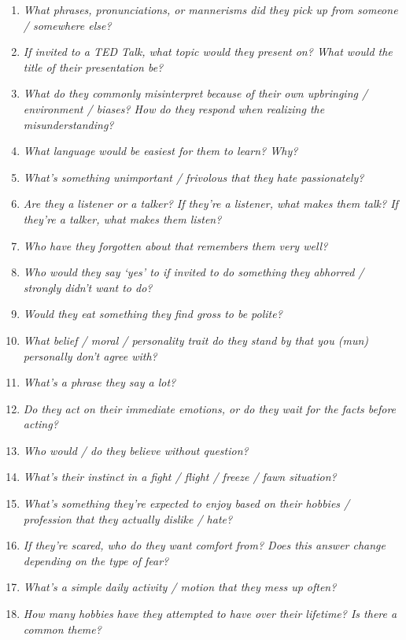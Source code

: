 \begin{enumerate}
    \item\textit{What phrases, pronunciations, or mannerisms did they pick up from someone / somewhere else?}
    \item\textit{If invited to a TED Talk, what topic would they present on? What would the title of their presentation be?}
    \item\textit{What do they commonly misinterpret because of their own upbringing / environment / biases? How do they respond when realizing the misunderstanding?}
    \item\textit{What language would be easiest for them to learn? Why?}
    \item\textit{What’s something unimportant / frivolous that they hate passionately?}
    \item\textit{Are they a listener or a talker? If they’re a listener, what makes them talk? If they’re a talker, what makes them listen?}
    \item\textit{Who have they forgotten about that remembers them very well?}
    \item\textit{Who would they say ‘yes’ to if invited to do something they abhorred / strongly didn’t want to do?}
    \item\textit{Would they eat something they find gross to be polite?}
    \item\textit{What belief / moral / personality trait do they stand by that you (mun) personally don’t agree with?}
    \item\textit{What’s a phrase they say a lot?}
    \item\textit{Do they act on their immediate emotions, or do they wait for the facts before acting?}
    \item\textit{Who would / do they believe without question?}
    \item\textit{What’s their instinct in a fight / flight / freeze / fawn situation?}
    \item\textit{What’s something they’re expected to enjoy based on their hobbies / profession that they actually dislike / hate?}
    \item\textit{If they’re scared, who do they want comfort from? Does this answer change depending on the type of fear?}
    \item\textit{What’s a simple daily activity / motion that they mess up often?}
    \item\textit{How many hobbies have they attempted to have over their lifetime? Is there a common theme?}
\end{enumerate}